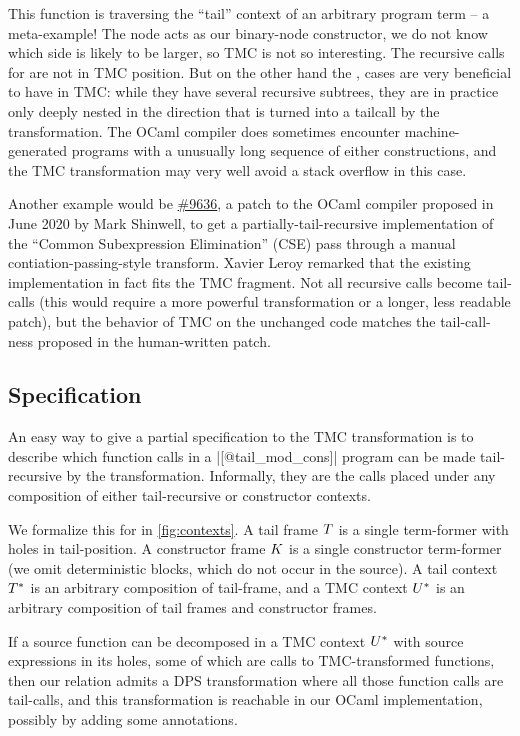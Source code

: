 This function is traversing the ``tail'' context of an arbitrary
program term -- a meta-example! The  node acts as
our binary-node constructor, we do not know which side is likely to be
larger, so TMC is not so interesting. The recursive calls for
 are not in TMC position. But on the other hand the
,  cases are very beneficial to have in
TMC: while they have several recursive subtrees, they are in practice
only deeply nested in the direction that is turned into a tailcall by
the transformation. The OCaml compiler does sometimes encounter
machine-generated programs with a unusually long sequence of either
constructions, and the TMC transformation may very well avoid a stack
overflow in this case.

Another example would be
\href{https://github.com/ocaml/ocaml/pull/9636}{\#9636}, a patch to
the OCaml compiler proposed in June 2020 by Mark Shinwell, to get
a partially-tail-recursive implementation of the ``Common
Subexpression Elimination'' (CSE) pass through a manual
contiation-passing-style transform. Xavier Leroy remarked that the
existing implementation in fact fits the TMC fragment. Not all
recursive calls become tail-calls (this would require a more powerful
transformation or a longer, less readable patch), but the behavior of
TMC on the unchanged code matches the tail-call-ness proposed in the
human-written patch.

\subsection{Specification} \label{subsec:specification} An easy way to
give a partial specification to the TMC transformation is to describe
which function calls in a \ocaml|[@tail_mod_cons]| program can be made
tail-recursive by the transformation. Informally, they are the calls
placed under any composition of either tail-recursive or
constructor contexts.

We formalize this for \DataLang in \cref{fig:contexts}. A tail frame $\datalangTailFrame$ is a single term-former with holes in tail-position. A constructor frame $\datalangConsFrame$ is a single constructor term-former (we omit deterministic blocks, which do not occur in the source). A tail context $\datalangTailCtx$ is an arbitrary composition of tail-frame, and a TMC context $\datalangTMCCtx$ is an arbitrary composition of tail frames and constructor frames.

If a source function can be decomposed in a TMC context $\datalangTMCCtx$ with source expressions in its holes, some of which are calls to TMC-transformed functions, then our relation admits a DPS transformation where all those function calls are tail-calls, and this transformation is reachable in our OCaml implementation, possibly by adding some annotations.

